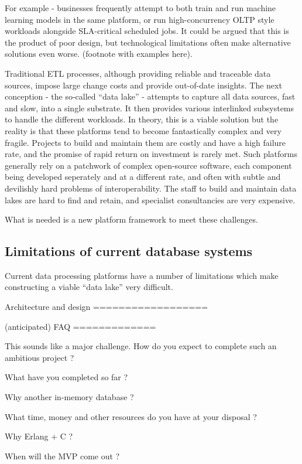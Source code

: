 \documentclass[12pt]{article}
\begin{document}
For example - businesses frequently attempt to both train and run machine learning models in the same platform, or run
high-concurrency OLTP style workloads alongside SLA-critical scheduled jobs. It could be argued that this is the product of
poor design, but technological limitations often make alternative solutions even worse. (footnote with examples here). 

Traditional ETL processes, although providing reliable and traceable data sources, impose large change costs and provide
out-of-date insights. The next conception - the so-called “data lake” - attempts to capture all data sources, fast and slow, 
into a single substrate. It then provides various interlinked subsystems to handle the different workloads. In theory, this is 
a viable solution but the reality is that these platforms tend to become fantastically complex and very fragile. Projects
to build and maintain them are costly and have a high failure rate, and the promise of rapid return on investment is rarely met. 
Such platforms generally rely on a patchwork of complex open-source software, each component being developed seperately and at a different rate, and often 
with subtle and devilishly hard problems of interoperability. The staff to build and maintain data lakes are hard to find and retain, and specialist 
consultancies are very expensive. 

What is needed is a new platform framework to meet these challenges.

\subsection{Limitations of current database systems}

Current data processing platforms have a number of limitations which make constructing a viable “data lake” very difficult. 


Architecture and design
==================


(anticipated) FAQ
=============

This sounds like a major challenge. How do you expect to complete such an ambitious project ?

What have you completed so far ?

Why another in-memory database ?

What time, money and other resources do you have at your disposal ?

Why Erlang + C ?

When will the MVP come out ?
\end{document}
